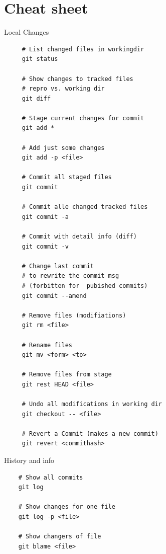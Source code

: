 \documentclass[
   draft=false
  ,paper=a4
  ,twoside=false
  ,fontsize=11pt
  ,headsepline
  ,DIV=11
  ,parskip=full+
  ,titlepage
]{scrartcl} %
\begin{document}
\section{Cheat sheet}
 \begin{minipage}[t]{0.45\linewidth}
     Local Changes
    \begin{lstlisting}
     # List changed files in workingdir
     git status
     
     # Show changes to tracked files 
     # repro vs. working dir
     git diff
     
     # Stage current changes for commit
     git add *
     
     # Add just some changes 
     git add -p <file>
     
     # Commit all staged files
     git commit 
     
     # Commit alle changed tracked files
     git commit -a
     
     # Commit with detail info (diff)
     git commit -v
     
     # Change last commit 
     # to rewrite the commit msg
     # (forbitten for  pubished commits)
     git commit --amend 
     
     # Remove files (modifiations)
     git rm <file>
     
     # Rename files
     git mv <form> <to>
     
     # Remove files from stage
     git rest HEAD <file>
     
     # Undo all modifications in working dir
     git checkout -- <file>
     
     # Revert a Commit (makes a new commit)
     git revert <commithash> 
    \end{lstlisting}
       History and info
    \begin{lstlisting}
    # Show all commits 
    git log
    
    # Show changes for one file
    git log -p <file>
    
    # Show changers of file
    git blame <file>
    \end{lstlisting}
    
  \end{minipage}%
  \hfill
\end{document}
